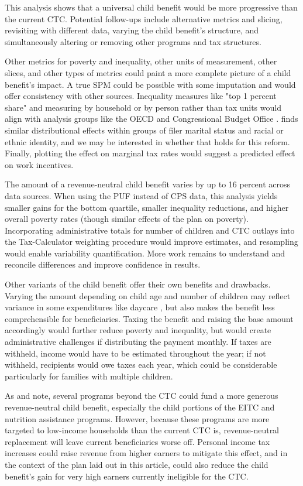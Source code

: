 \documentclass[12pt]{article}
\begin{document}
This analysis shows that a universal child benefit would be more progressive than the current CTC. Potential follow-ups include alternative metrics and slicing, revisiting with different data, varying the child benefit's structure, and simultaneously altering or removing other programs and tax structures.

Other metrics for poverty and inequality, other units of measurement, other slices, and other types of metrics could paint a more complete picture of a child benefit's impact. A true SPM could be possible with some imputation and would offer consistency with other sources. Inequality measures like "top 1 percent share" and measuring by household or by person rather than tax units would align with analysis groups like the OECD and Congressional Budget Office \cite{burtless2016alternative}.  finds similar distributional effects within groups of filer marital status and racial or ethnic identity, and we may be interested in whether that holds for this reform. Finally, plotting the effect on marginal tax rates would suggest a predicted effect on work incentives.

The amount of a revenue-neutral child benefit varies by up to 16 percent across data sources. When using the PUF instead of CPS data, this analysis yields smaller gains for the bottom quartile, smaller inequality reductions, and higher overall poverty rates (though similar effects of the plan on poverty). Incorporating administrative totals for number of children and CTC outlays into the Tax-Calculator weighting procedure would improve estimates, and resampling would enable variability quantification. More work remains to understand and reconcile differences and improve confidence in results.

Other variants of the child benefit offer their own benefits and drawbacks. Varying the amount depending on child age and number of children may reflect variance in some expenditures like daycare \cite{shaefer2018universal}, but also makes the benefit less comprehensible for beneficiaries. Taxing the benefit and raising the base amount accordingly would further reduce poverty and inequality, but would create administrative challenges if distributing the payment monthly. If taxes are withheld, income would have to be estimated throughout the year; if not withheld, recipients would owe taxes each year, which could be considerable particularly for families with multiple children.

As  and  note, several programs beyond the CTC could fund a more generous revenue-neutral child benefit, especially the child portions of the EITC and nutrition assistance programs. However, because these programs are more targeted to low-income households than the current CTC is, revenue-neutral replacement will leave current beneficiaries worse off. Personal income tax increases could raise revenue from higher earners to mitigate this effect, and in the context of the plan laid out in this article, could also reduce the child benefit's gain for very high earners currently ineligible for the CTC.
\end{document}
